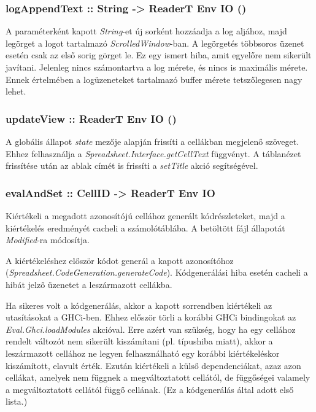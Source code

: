\subsubsection{logAppendText :: String -> ReaderT Env IO ()}

A paraméterként kapott \textit{String}-et új sorként hozzáadja a log aljához, majd legörget a logot tartalmazó \textit{ScrolledWindow}-ban. A legörgetés többsoros üzenet esetén csak az első sorig görget le. Ez egy ismert hiba, amit egyelőre nem sikerült javítani. Jelenleg nincs számontartva a log mérete, és nincs is maximális mérete. Ennek értelmében a logüzeneteket tartalmazó buffer mérete tetszőlegesen nagy lehet.

\subsubsection{updateView :: ReaderT Env IO ()}

A globális állapot \textit{state} mezője alapján frissíti a cellákban megjelenő szöveget. Ehhez felhasználja a \textit{Spreadsheet.Interface.getCellText} függvényt. A táblanézet frissítése után az ablak címét is frissíti a \textit{setTitle} akció segítségével.

\subsubsection{evalAndSet :: CellID -> ReaderT Env IO}

Kiértékeli a megadott azonosítójú cellához generált kódrészleteket, majd a kiértékelés eredményét cacheli a számolótáblába. A betöltött fájl állapotát \textit{Modified}-ra módosítja.

A kiértékeléshez először kódot generál a kapott azonosítóhoz \mbox{(\textit{Spreadsheet.CodeGeneration.generateCode})}. Kódgenerálási hiba esetén cacheli a hibát jelző üzenetet a leszármazott cellákba.

Ha sikeres volt a kódgenerálás, akkor a kapott sorrendben kiértékeli az utasításokat a GHCi-ben. Ehhez először törli a korábbi GHCi bindingokat az \textit{Eval.Ghci.loadModules} akcióval. Erre azért van szükség, hogy ha egy cellához rendelt változót nem sikerült kiszámítani (pl. típushiba miatt), akkor a leszármazott cellához ne legyen felhasználható egy korábbi kiértékeléskor kiszámított, elavult érték. Ezután kiértékeli a külső dependenciákat, azaz azon cellákat, amelyek nem függnek a megváltoztatott cellától, de függőségei valamely  a megváltoztatott cellától függő cellának. (Ez a kódgenerálás által adott első lista.)

